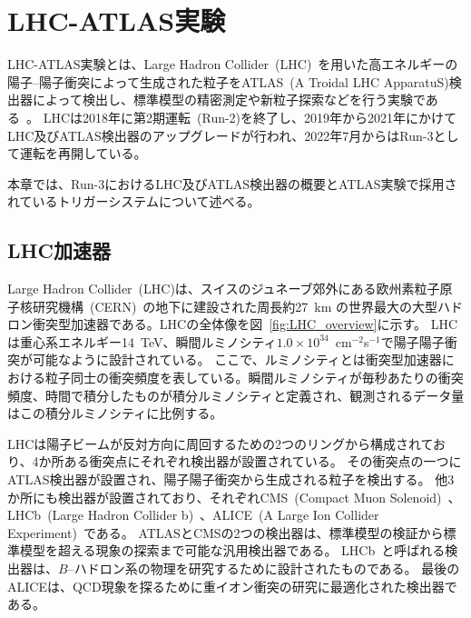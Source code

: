 \chapter{LHC-ATLAS実験}\label{chapter2}

LHC-ATLAS実験とは、Large Hadron Collider~(LHC)~\cite{article:LHC}を用いた高エネルギーの陽子–陽子衝突によって生成された粒子をATLAS~(A Troidal LHC ApparatuS)検出器によって検出し、標準模型の精密測定や新粒子探索などを行う実験である~\cite{Aad:1129811}。
LHCは2018年に第2期運転~(Run-2)を終了し、2019年から2021年にかけてLHC及びATLAS検出器のアップグレードが行われ、2022年7月からはRun-3として運転を再開している。

本章では、Run-3におけるLHC及びATLAS検出器の概要とATLAS実験で採用されているトリガーシステムについて述べる。

\section{LHC加速器}
\label{section2-1}
Large Hadron Collider~(LHC)は、スイスのジュネーブ郊外にある欧州素粒子原子核研究機構~(CERN)~\cite{article:CERN}の地下に建設された周長約27~km の世界最大の大型ハドロン衝突型加速器である。LHCの全体像を図~\ref{fig:LHC_overview}に示す。
LHCは重心系エネルギー14~TeV、瞬間ルミノシティ$1.0\times10^{34}$~cm$^{-2}$s$^{-1}$で陽子陽子衝突が可能なように設計されている。
ここで、ルミノシティとは衝突型加速器における粒子同士の衝突頻度を表している。瞬間ルミノシティが毎秒あたりの衝突頻度、時間で積分したものが積分ルミノシティと定義され、観測されるデータ量はこの積分ルミノシティに比例する。

LHCは陽子ビームが反対方向に周回するための2つのリングから構成されており、4か所ある衝突点にそれぞれ検出器が設置されている。
その衝突点の一つにATLAS検出器が設置され、陽子陽子衝突から生成される粒子を検出する。
他3か所にも検出器が設置されており、それぞれCMS~(Compact Muon Solenoid)~\cite{article:CMSExperiment}、LHCb~(Large Hadron Collider b)~\cite{article:LHCbExperiment}、ALICE~(A Large Ion Collider Experiment)~\cite{article:ALICEExperiment}である。
ATLASとCMSの2つの検出器は、標準模型の検証から標準模型を超える現象の探索まで可能な汎用検出器である。
LHCb~と呼ばれる検出器は、$B$--ハドロン系の物理を研究するために設計されたものである。
最後のALICEは、QCD現象を探るために重イオン衝突の研究に最適化された検出器である。


